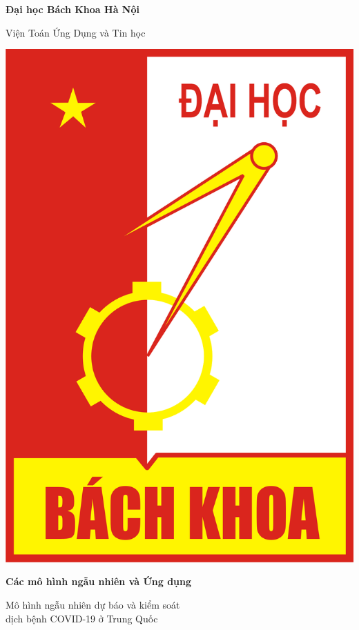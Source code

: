 \documentclass[10pt]{article}
\begin{document}
\begin{titlepage}
    \begin{center}
        
        \Huge
        \textbf{Đại học Bách Khoa Hà Nội}
        
        \vspace{0.5cm}
        \LARGE
        Viện Toán Ứng Dụng và Tin học
        
        \vspace{1.5cm}
        \includegraphics[scale=0.7]{hust.png}
        
        \vspace{1.5cm}
        \LARGE
        \textbf{Các mô hình ngẫu nhiên và Ứng dụng}
        
        \vspace{1cm}
        \Large
        Mô hình ngẫu nhiên dự báo và kiểm soát \\ dịch bệnh COVID-19 ở Trung Quốc
        

\end{center}
\end{titlepage}
\end{document}
